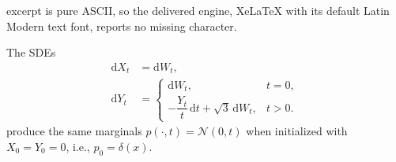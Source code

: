 \documentclass[10pt,a4paper]{amsart}
\newcommand{\dWt}{\mathrm{d}W_t}
\newcommand{\dt}{\mathrm{d}t}
\begin{document}
excerpt is pure ASCII, so the delivered engine, XeLaTeX with its default Latin Modern text font, reports no missing character.
\begin{ex}
\label{ex: non_identifiability_time_inhomo} The SDEs 
\begin{align}
    \mathrm{d}X_t &= \mathrm{d}W_t, \\
    \mathrm{d}Y_t &=
    \begin{cases}
         \mathrm{d}W_t, & t = 0, \\
        -\dfrac{Y_t}{t} \, \mathrm{d}t + \sqrt{3} \, \mathrm{d}W_t, & t > 0.
    \end{cases}
\end{align}
produce the same marginals $p(\cdot, t)=\mathcal{N}(0,t)$ when initialized with $X_0=Y_0=0$, i.e., $p_0=\delta(x)$.  
\end{ex}
\end{document}
